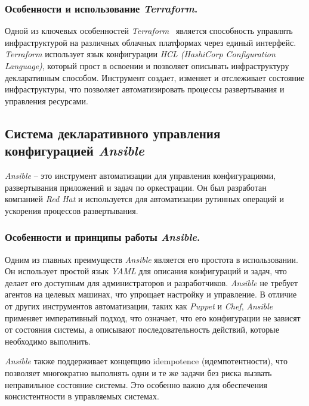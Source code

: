 \subsubsection{Особенности и использование \textit{Terraform}.}
Одной из ключевых особенностей \textit{Terraform}~\cite{terraform} является способность управлять инфраструктурой на различных облачных платформах через единый интерфейс. \textit{Terraform} использует язык конфигурации \textit{HCL (HashiCorp Configuration Language)}, который прост в освоении и позволяет описывать инфраструктуру декларативным способом. Инструмент создает, изменяет и отслеживает состояние инфраструктуры, что позволяет автоматизировать процессы развертывания и управления ресурсами.
\subsection{Система декларативного управления конфигурацией \textit{Ansible}}
\label{sec:ansible}
\textit{Ansible} -- это инструмент автоматизации для управления конфигурациями, развертывания приложений и задач по оркестрации. Он был разработан компанией \textit{Red Hat} и используется для автоматизации рутинных операций и ускорения процессов развертывания.

\subsubsection{Особенности и принципы работы \textit{Ansible}.}
Одним из главных преимуществ \textit{Ansible} является его простота в использовании. Он использует простой язык \textit{YAML} для описания конфигураций и задач, что делает его доступным для администраторов и разработчиков. \textit{Ansible} не требует агентов на целевых машинах, что упрощает настройку и управление. В отличие от других инструментов автоматизации, таких как \textit{Puppet} и \textit{Chef}, \textit{Ansible} применяет императивный подход, что означает, что его конфигурации не зависят от состояния системы, а описывают последовательность действий, которые необходимо выполнить. 

\textit{Ansible} также поддерживает концепцию idempotence (идемпотентности), что позволяет многократно выполнять одни и те же задачи без риска вызвать неправильное состояние системы. Это особенно важно для обеспечения консистентности в управляемых системах.

